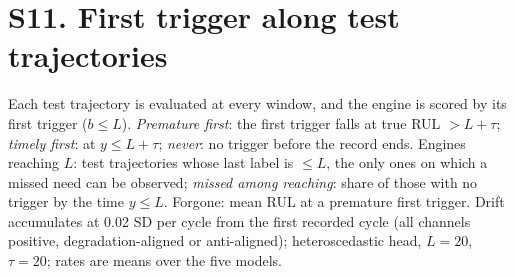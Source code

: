 \documentclass[10pt,a4paper]{article}
\begin{document}
\begin{table}[H]\centering\scriptsize
\caption{All five mechanisms under degradation-aligned and anti-aligned 2 SD ramps, $L=20$ (\% of evaluated engines). The aligned ramp drives every mechanism to the ceiling set by the share of engines with $y>L+\tau$.}\label{tab:mechall}

\end{table}
\begin{table}[H]\centering\scriptsize
\caption{Single-channel $\pm2$ SD ramps on the final window, heteroscedastic head, $L=20$: premature / unrecognised (\%). Columns: sub-dataset digit and backbone (L LSTM, T Transformer); $\cdot$: channel constant on that sub-dataset and not used.}\label{tab:chan}

\end{table}

\FloatBarrier
\section*{S11. First trigger along test trajectories}
\noindent Each test trajectory is evaluated at every window, and the engine is scored by its first trigger ($b\le L$). \emph{Premature first}: the first trigger falls at true RUL $>L+\tau$; \emph{timely first}: at $y\le L+\tau$; \emph{never}: no trigger before the record ends. Engines reaching $L$: test trajectories whose last label is $\le L$, the only ones on which a missed need can be observed; \emph{missed among reaching}: share of those with no trigger by the time $y\le L$. Forgone: mean RUL at a premature first trigger. Drift accumulates at 0.02 SD per cycle from the first recorded cycle (all channels positive, degradation-aligned or anti-aligned); heteroscedastic head, $L=20$, $\tau=20$; rates are means over the five models.
\begin{center}\scriptsize
\resizebox{\textwidth}{!}{}
\end{center}
\end{document}
